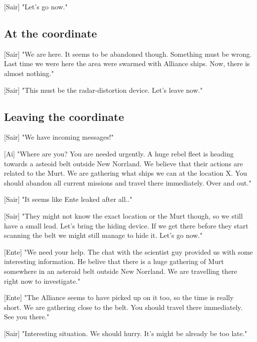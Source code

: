 \documentclass[a4paper,12pt]{article}
\begin{document}
[Sair] "Let's go now."

\subsection{At the coordinate}

[Sair] "We are here. It seems to be abandoned though. Something must be wrong. Last time we were here the area were swarmed with Alliance ships. 
Now, there is almost nothing."

[Sair] "This must be the radar-distortion device. Let's leave now."

\subsection{Leaving the coordinate}

[Sair] "We have incoming messages!"

[Ai] "Where are you? You are needed urgently. A huge rebel fleet is heading towards a asteoid belt outside New Norrland. We believe that
their actions are related to the Murt. We are gathering what ships we can at the location X. You should abandon all current missions and travel there
immediately. Over and out."

[Sair] "It seems like Ente leaked after all.." 

[Sair] "They might not know the exact location or the Murt though, so we still have a small lead. Let's bring the hiding device.
If we get there before they start scanning the belt we might still manage to hide it. Let's go now."

[Ente] "We need your help. The chat with the scientist guy provided us with some interesting information. He belive that there is a huge gathering
of Murt somewhere in an asteroid belt outside New Norrland. We are travelling there right now to investigate."

[Ente] "The Alliance seems to have picked up on it too, so the time is really short. We are gathering close to the belt. 
You should travel there immediately. See you there."

[Sair] "Interesting situation. We should hurry. It's might be already be too late."
\end{document}
